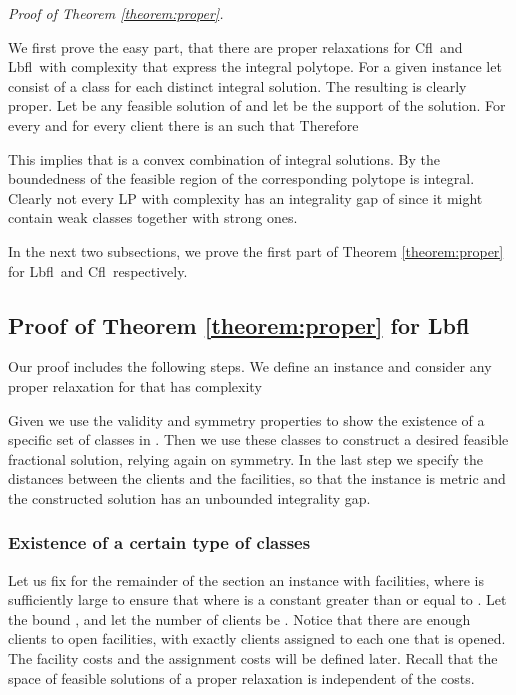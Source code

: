 \documentclass[11pt]{article}
\newcommand{\lbfl}{{\sc Lbfl}}
\newcommand{\cfl}{{\sc Cfl}}
\begin{document}
\vspace*{0.8cm}

\noindent
{\em Proof of Theorem \ref{theorem:proper}.}

We first prove the easy part, 
that there are proper relaxations for \cfl\ and \lbfl\ with complexity  that
express the integral polytope.
For a given instance let  consist of a class for each
distinct integral solution. The resulting  is clearly
proper. Let  be any feasible solution of  and let
 be the support of  the solution. For every  and 
for every client  there is an  such that  Therefore 

This implies that  is a convex combination of integral
solutions. By the boundedness of the feasible region of
 the  corresponding polytope is integral.  
Clearly not every LP with complexity  has an integrality gap of 
since it might contain weak classes together with  strong
ones.

In the next two subsections, 
we prove the first part of Theorem \ref{theorem:proper} for \lbfl\ and \cfl\ respectively.





\subsection{Proof of Theorem \ref{theorem:proper} for \lbfl\ }
\label{sec:proof_theorem_p1}

Our proof includes the following steps. We define an instance  
and consider any proper relaxation  for  that has complexity
 
Given  we use   the validity  and symmetry properties to show the existence of
a specific set of classes in . Then we use these classes to construct a
desired feasible fractional solution, relying again on symmetry. 
In the last step  we specify  the distances between the clients and  the facilities, so
that the instance is metric and the constructed solution has an  unbounded integrality
gap.



\subsubsection{Existence of a certain type of classes}

Let us fix for the remainder of the section 
an instance  with  facilities, where  is
sufficiently large to ensure  that   where
  is a
constant greater than or equal to  . Let the bound , and let
the number of  clients be . Notice that  there are enough clients
to open  facilities, with  exactly  clients assigned  to each
one that is opened. The  facility costs  and the assignment  costs will  be defined
later.  Recall  that the  space  of  feasible  solutions of  a  proper
relaxation is independent of the costs.
\end{document}
